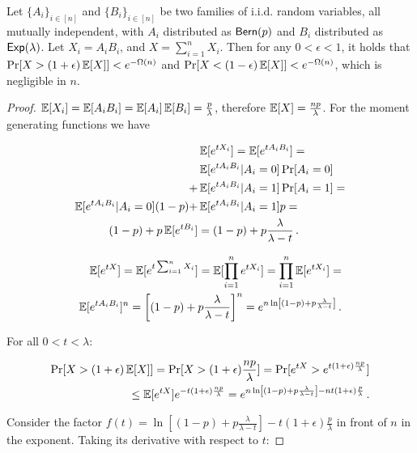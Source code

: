 \begin{lemma}\label{lem:bern-exp}
  Let $\{ A_i \}_{i \in [n]}$ and $\{ B_i \}_{i \in [n]}$ be two families of i.i.d. random variables,
  all mutually independent,
  with $A_i$ distributed as $\textsf{Bern}(p)$ and $B_i$ distributed as $\textsf{Exp}(\lambda)$.
  Let $X_i = A_i B_i$, and $X = \sum_{i = 1}^n X_i$.
  Then for any $0 < \epsilon < 1$, it holds that
  $\Pr[X > (1 + \epsilon) \mathop{{}\mathbb{E}}[X]] < e^{-\Omega(n)}$ and
  $\Pr[X < (1 - \epsilon) \mathop{{}\mathbb{E}}[X]] < e^{-\Omega(n)}$,
  which is negligible in $n$.
\end{lemma}
\begin{proof}
  $\mathop{{}\mathbb{E}}[X_i] = \mathop{{}\mathbb{E}}[A_i B_i] = \mathop{{}\mathbb{E}}[A_i] \mathop{{}\mathbb{E}}[B_i] = \frac{p}{\lambda}$, therefore
  $\mathop{{}\mathbb{E}}[X] = \frac{np}{\lambda}$. For the moment generating functions we have

  \begin{align*}
    &\mathop{{}\mathbb{E}}[e^{t X_i}] = \mathop{{}\mathbb{E}}[e^{t A_i B_i}] =\\
      &\mathop{{}\mathbb{E}}[e^{t A_i B_i}|A_i = 0] \Pr[A_i = 0]\\
    + &\mathop{{}\mathbb{E}}[e^{t A_i B_i}|A_i = 1] \Pr[A_i = 1] = \\
    \mathop{{}\mathbb{E}}[e^{t A_i B_i}|A_i = 0] (1 - p) + &\mathop{{}\mathbb{E}}[e^{t A_i B_i}|A_i = 1] p = \\
    (1 - p) + p \mathop{{}\mathbb{E}}[e^{t B_i}] &= (1 - p) + p \frac{\lambda}{\lambda - t}\,.
  \end{align*}

  \begin{align*}
    \mathop{{}\mathbb{E}}[e^{tX}] = \mathop{{}\mathbb{E}}[e^{t \sum_{i = 1}^n X_i}] = \mathop{{}\mathbb{E}}[\prod_{i = 1}^n e^{t X_i}] = \prod_{i = 1}^n \mathop{{}\mathbb{E}}[e^{t X_i}] = \\
    \mathop{{}\mathbb{E}}[e^{t A_i B_i}]^n = \left[(1 - p) + p\frac{\lambda}{\lambda - t}\right]^n = e^{n \ln\left[(1 - p) + p\frac{\lambda}{\lambda - t}\right]}\,.
  \end{align*}

  For all $0 < t < \lambda$:

  \begin{align*}
    \Pr[X > (1 + \epsilon)\mathop{{}\mathbb{E}}[X]] = \Pr[X > (1 + \epsilon)\frac{np}{\lambda}]= \Pr[e^{tX} > e^{t(1 + \epsilon)\frac{np}{\lambda}}]\\
    \leq \mathop{{}\mathbb{E}}[e^{tX}] e^{-t(1 + \epsilon)\frac{np}{\lambda}}
    = e^{n \ln\left[(1 - p) + p\frac{\lambda}{\lambda - t}\right] - n t(1 + \epsilon)\frac{p}{\lambda}}\,.
  \end{align*}

  Consider the factor
  $f(t) = \ln\left[(1 - p) + p\frac{\lambda}{\lambda - t}\right] - t(1 + \epsilon)\frac{p}{\lambda}$
  in front of $n$ in the exponent. Taking its derivative with respect to $t$:


\end{proof}

